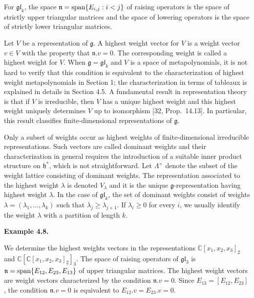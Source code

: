 For $\mathfrak{gl}_{k}$, the space $\mathfrak{n}=\textup{span}\{E_{i,j}:i<j\}$ of raising operators is the space of strictly upper triangular matrices and the space of lowering operators is the space of strictly lower triangular matrices.





Let $V$ be a representation of $\mathfrak{g}$. A highest weight vector for $V$ is a weight vector $v\in V$ with the property that $\mathfrak{n}.v=0$. The corresponding weight is called a highest weight for $V$. When $\mathfrak{g}=\mathfrak{gl}_{k}$ and $V$ is a space of metapolynomials, it is not hard to verify that this condition is equivalent to the characterization of highest weight metapolynomials in Section 1; the characterization in terms of tableaux is explained in details in Section 4.5. A fundamental result in representation theory is that if $V$ is irreducible, then $V$ has a unique highest weight and this highest weight uniquely determines $V$ up to isomorphism [32, Prop. 14.13]. In particular, this result classifies finite-dimensional representations of $\mathfrak{g}$.





Only a subset of weights occur as highest weights of finite-dimensional irreducible representations. Such vectors are called dominant weights and their characterization in general requires the introduction of a suitable inner product structure on $\mathfrak{h}^{*}$, which is not straightforward. Let $\Lambda^{+}$ denote the subset of the weight lattice consisting of dominant weights. The representation associated to the highest weight $\lambda$ is denoted $V_{\lambda}$ and it is the unique $\mathfrak{g}$-representation having highest weight $\lambda$. In the case of $\mathfrak{gl}_{k}$, the set of dominant weights consist of weights $\lambda=(\lambda_{1},\ldots,\lambda_{k})$ such that $\lambda_{j}\geq\lambda_{j+1}$. If $\lambda_{i}\geq 0$ for every $i$, we usually identify the weight $\lambda$ with a partition of length $k$.





\par\medskip\noindent\textbf{Example 4.8.}\par



We determine the highest weights vectors in the representations $\mathbb{C}[x_{1},x_{2},x_{3}]_{2}$ and $\mathbb{C}[\mathbb{C}[x_{1},x_{2},x_{3}]_{2}]_{3}$. The space of raising operators of $\mathfrak{gl}_{3}$ is $\mathfrak{n}=\textnormal{span}\{E_{12},E_{23},E_{13}\}$ of upper triangular matrices. The highest weight vectors are weight vectors characterized by the condition $\mathfrak{n}.v=0$. Since $E_{13}=[E_{12},E_{23}]$, the condition $\mathfrak{n}.v=0$ is equivalent to $E_{12}.v=E_{23}.v=0$.





